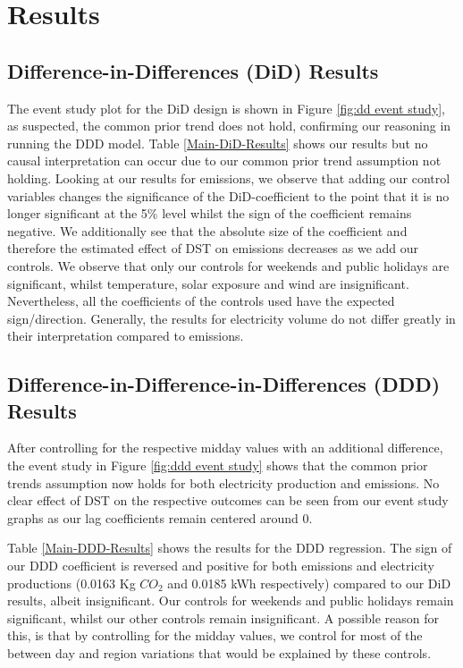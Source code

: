 
\section{Results}
\subsection{Difference-in-Differences (DiD) Results}

The event study plot for the \ac{DiD} design is shown in Figure \ref{fig:dd event study}, as suspected, the common prior trend does not hold, confirming our reasoning in running the \ac{DDD} model.
Table \ref{Main-DiD-Results} shows our results but no causal interpretation can occur due to our common prior trend assumption not holding. Looking at our results for emissions, we observe that adding our control variables changes the significance of the \ac{DiD}-coefficient to the point that it is no longer significant at the 5\% level whilst the sign of the coefficient remains negative. We additionally see that the absolute size of the coefficient and therefore the estimated effect of DST on emissions decreases as we add our controls. We observe that only our controls for weekends and public holidays are significant, whilst temperature, solar exposure and wind are insignificant. Nevertheless, all the coefficients of the controls used have the expected sign/direction. Generally, the results for electricity volume do not differ greatly in their interpretation compared to emissions.

\subsection{Difference-in-Difference-in-Differences (DDD) Results}

After controlling for the respective midday values with an additional difference, the event study in Figure \ref{fig:ddd event study} shows that the common prior trends assumption now holds for both electricity production and emissions. No clear effect of DST on the respective outcomes can be seen from our event study graphs as our lag coefficients remain centered around $0$.

Table \ref{Main-DDD-Results} shows the results for the \ac{DDD} regression. 
The sign of our \ac{DDD} coefficient is reversed and positive for both emissions and electricity productions (0.0163 Kg $CO_2$ and 0.0185 kWh respectively) compared to our \ac{DiD} results, albeit insignificant. Our controls for weekends and public holidays remain significant, whilst our other controls remain insignificant. A possible reason for this, is that by controlling for the midday values, we control for most of the between day and region variations that would be explained by these controls. 

